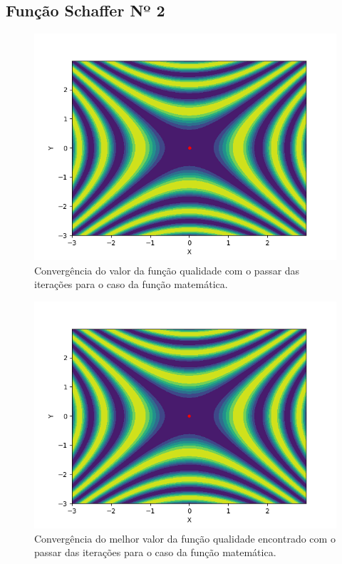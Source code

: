 \documentclass[conference]{IEEEtran}
\begin{document}
\subsection{Função Schaffer Nº 2}

\begin{figure}[htbp]
\centering
\centerline{\includegraphics[scale=0.4]{imagens/schaffer2d/ses.png}}
\caption{Convergência do valor da função qualidade com o passar das iterações para o caso da função matemática.}
\label{schaffer2d/ses}
\end{figure} 

\begin{figure}[htbp]
\centering
\centerline{\includegraphics[scale=0.4]{imagens/schaffer2d/cmaes.png}}
\caption{Convergência do melhor valor da função qualidade encontrado com o passar das iterações para o caso da função matemática.}
\label{schaffer2d/cmaes}
\end{figure}
\end{document}
